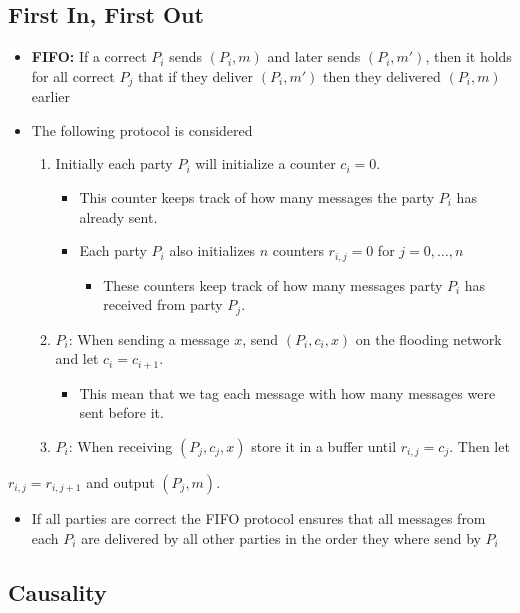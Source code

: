 \documentclass[11pt]{article}
\begin{document}
\subsection{First In, First Out}
\label{sec:org709bf58}
\begin{itemize}
\item \textbf{FIFO:} If a correct \(P_i\) sends \((P_i,m)\) and later sends \((P_i,m')\), then it holds for all correct \(P_j\) that if they deliver \((P_i,m')\) then they delivered \((P_i,m)\) earlier

\item The following protocol is considered
\begin{enumerate}
\item Initially each party \(P_i\) will initialize a counter \(c_i = 0\).
\begin{itemize}
\item This counter keeps track of how many messages the party \(P_i\) has already sent.
\item Each party \(P_i\) also initializes \(n\) counters \(r_{i,j}=0\) for \(j=0,\dots,n\)
\begin{itemize}
\item These counters keep track of how many messages party \(P_i\) has received from party \(P_j\).
\end{itemize}
\end{itemize}
\item \(P_i\): When sending a message \(x\), send \((P_i,c_i,x)\) on the flooding network and let \(c_i = c_{i + 1}\).
\begin{itemize}
\item This mean that we tag each message with how many messages were sent before it.
\end{itemize}
\item \(P_i\): When receiving \((P_j,c_j,x)\) store it in a buffer until \(r_{i,j} = c_j\). Then let
\end{enumerate}
\end{itemize}
\(r_{i,j}=r_{i,j+1}\) and output \((P_j,m)\).

\begin{itemize}
\item If all parties are correct the FIFO protocol ensures that all messages from each \(P_i\) are delivered by all other parties in the order they where send by \(P_i\)
\end{itemize}

\subsection{Causality}
\label{sec:org4b75947}
\end{document}
